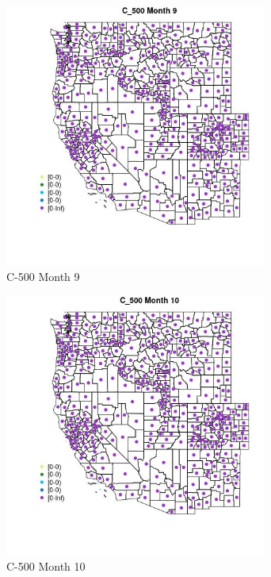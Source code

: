 \begin{figure} 
\centering  
\includegraphics[width=0.77\textwidth]{Code_Outputs/df_report_ML_predictors_CountyCentroid_Locations_Dates_2008-01-01to2018-12-31_MapObsMo9C_500.jpg} 
\caption{\label{fig:df_report_ML_predictors_CountyCentroid_Locations_Dates_2008-01-01to2018-12-31MapObsMo9C_500}C-500 Month 9} 
\end{figure} 
 

\begin{figure} 
\centering  
\includegraphics[width=0.77\textwidth]{Code_Outputs/df_report_ML_predictors_CountyCentroid_Locations_Dates_2008-01-01to2018-12-31_MapObsMo10C_500.jpg} 
\caption{\label{fig:df_report_ML_predictors_CountyCentroid_Locations_Dates_2008-01-01to2018-12-31MapObsMo10C_500}C-500 Month 10} 
\end{figure} 
 

